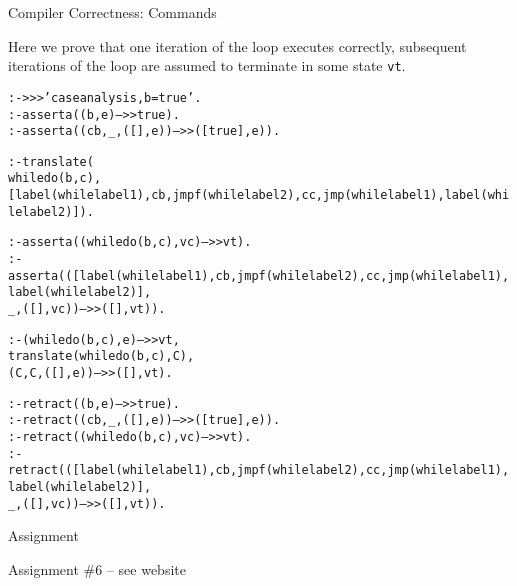 \documentclass{beamer}
\begin{document}
\begin{frame}[fragile]{Compiler Correctness: Commands}

\scriptsize
Here we prove that one iteration of the loop executes correctly, subsequent iterations of
the loop are assumed to terminate in some state {\tt vt}.

\tiny
\begin{alltt}
:- >>> '    case analysis, b=true'.
:- asserta((b,e) -->> true).
:- asserta((cb,_,([],e)) -->> ([true],e)).

% lemma: prove that the translation of whiledo(b,c) is the piece of stack machine code shown
:- translate(
    whiledo(b,c),
    [label(whilelabel1),cb,jmpf(whilelabel2),cc,jmp(whilelabel1),label(whilelabel2)]).

% it is sufficient to prove the correctness for the loop for only one iteration
% assume that the remaining itereations after the first iteration give us some 
% terminal state vt - we assume this both in the source and target language
:- asserta((whiledo(b,c),vc) -->> vt). 
:- asserta(([label(whilelabel1),cb,jmpf(whilelabel2),cc,jmp(whilelabel1),label(whilelabel2)],
                _,([],vc)) -->> ([],vt)).

:- (whiledo(b,c),e) -->> vt,
    translate(whiledo(b,c),C),
    (C,C,([],e)) -->> ([],vt).

:- retract((b,e) -->> true).
:- retract((cb,_,([],e)) -->> ([true],e)).
:- retract((whiledo(b,c),vc) -->> vt). 
:- retract(([label(whilelabel1),cb,jmpf(whilelabel2),cc,jmp(whilelabel1),label(whilelabel2)],
                _,([],vc)) -->> ([],vt)).
\end{alltt}
\end{frame}

\begin{frame}[fragile]{Assignment}

Assignment \#6 -- see website
\end{frame}
\end{document}
